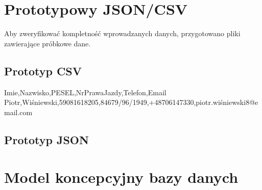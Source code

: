 \documentclass[a4paper,11pt,english,openany,oneside]{sphinxmanual}
\begin{document}
\section{Prototypowy JSON/CSV}
\label{\detokenize{rozdzial_3/index:prototypowy-json-csv}}
\sphinxAtStartPar
Aby zweryfikować kompletność wprowadzanych danych, przygotowano pliki zawierające próbkowe dane.


\subsection{Prototyp CSV}
\label{\detokenize{rozdzial_3/index:prototyp-csv}}
\begin{sphinxVerbatim}[commandchars=\\\{\}]
Imie,Nazwisko,PESEL,Nr\PYGZus{}Prawa\PYGZus{}Jazdy,Telefon,Email
Piotr,Wiśniewski,59081618205,84679/96/1949,+48706147330,piotr.wiśniewski8@email.com
\end{sphinxVerbatim}


\subsection{Prototyp JSON}
\label{\detokenize{rozdzial_3/index:prototyp-json}}
\begin{sphinxVerbatim}[commandchars=\\\{\}]
\PYG{p}{[}
\PYG{p}{]}
\end{sphinxVerbatim}


\section{Model koncepcyjny bazy danych}
\label{\detokenize{rozdzial_3/index:model-koncepcyjny-bazy-danych}}
\end{document}

